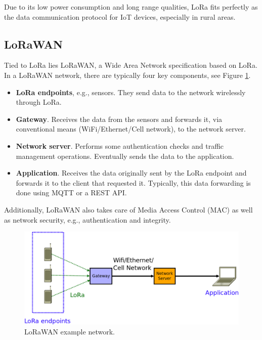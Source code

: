 Due to its low power consumption and long range qualities, LoRa fits perfectly as the data communication protocol for IoT devices, especially in rural areas.

\subsection{LoRaWAN}
Tied to LoRa lies LoRaWAN\cite{lorawan}, a Wide Area Network specification based on LoRa. In a LoRaWAN network, there are typically four key components, see Figure \ref{fig:lorawan}.
\begin{itemize}
    \item \textbf{LoRa endpoints}, e.g., sensors. They send data to the network wirelessly through LoRa.
    \item \textbf{Gateway}. Receives the data from the sensors and forwards it, via conventional means (WiFi/Ethernet/Cell network), to the network server.
    \item \textbf{Network server}. Performs some authentication checks and traffic management operations. Eventually sends the data to the application.
    \item \textbf{Application}. Receives the data originally sent by the LoRa endpoint and forwards it to the client that requested it. Typically, this data forwarding is done using MQTT or a REST API.
\end{itemize}

Additionally, LoRaWAN also takes care of Media Access Control (MAC) as well as network security, e.g., authentication and integrity.

\begin{figure}
  \centering
  \includegraphics[width=\linewidth]{imagenes/Technologies/lorawan.png}
  \caption{LoRaWAN example network.}
  \label{fig:lorawan}
\end{figure}
